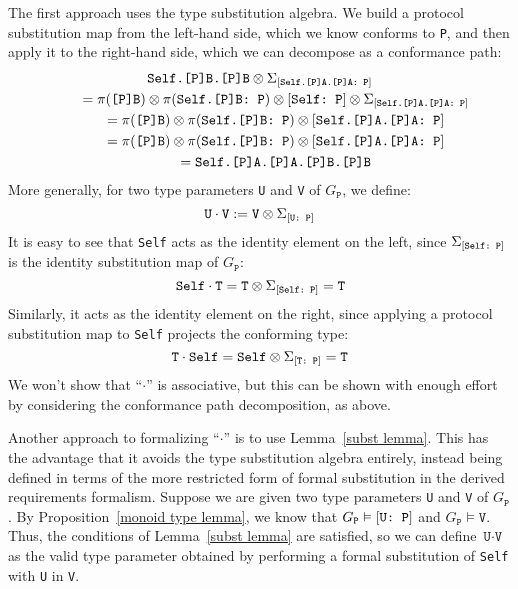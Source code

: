 \documentclass[../generics]{subfiles}
\begin{document}
The first approach uses the type substitution algebra. We build a protocol substitution map from the left-hand side, which we know conforms to \texttt{P}, and then apply it to the right-hand side, which we can decompose as a conformance path:
\begin{gather*}
\texttt{Self.[P]B.[P]B}\otimes\Sigma_{[\texttt{Self.[P]A.[P]A:~P}]}\\
\qquad {} = \pi(\texttt{[P]B}) \otimes \pi(\texttt{Self.[P]B:~P}) \otimes [\texttt{Self:~P}] \otimes \Sigma_{[\texttt{Self.[P]A.[P]A:~P}]}\\
\qquad {} = \pi(\texttt{[P]B}) \otimes \pi(\texttt{Self.[P]B:~P}) \otimes [\texttt{Self.[P]A.[P]A:~P}]\\
\qquad {} = \pi(\texttt{[P]B}) \otimes \pi(\texttt{Self.[P]B:~P}) \otimes [\texttt{Self.[P]A.[P]A:~P}]\\
\qquad {} = \texttt{Self.[P]A.[P]A.[P]B.[P]B}
\end{gather*}
More generally, for two type parameters \texttt{U} and \texttt{V} of $G_\texttt{P}$, we define:
\[\texttt{U}\cdot\texttt{V}:=\texttt{V}\otimes\Sigma_{[\texttt{U:~P}]}\]
It is easy to see that \texttt{Self} acts as the identity element on the left, since $\Sigma_{[\texttt{Self:~P}]}$ is the identity substitution map of $G_\texttt{P}$:
\[
\texttt{Self}\cdot\texttt{T} = \texttt{T}\otimes\Sigma_{[\texttt{Self:~P}]} = \texttt{T}
\]
Similarly, it acts as the identity element on the right, since applying a protocol substitution map to \texttt{Self} projects the conforming type:
\[
\texttt{T}\cdot\texttt{Self} = \texttt{Self}\otimes\Sigma_{[\texttt{T:~P}]} = \texttt{T}
\]
We won't show that ``$\cdot$'' is associative, but this can be shown with enough effort by considering the conformance path decomposition, as above.

Another approach to formalizing ``$\cdot$'' is to use Lemma~\ref{subst lemma}. This has the advantage that it avoids the type substitution algebra entirely, instead being defined in terms of the more restricted form of formal substitution in the derived requirements formalism. Suppose we are given two type parameters \texttt{U} and \texttt{V} of $G_\texttt{P}$. By Proposition~\ref{monoid type lemma}, we know that $G_\texttt{P}\vDash[\texttt{U:~P}]$ and $G_\texttt{P}\vDash\texttt{V}$. Thus, the conditions of Lemma~\ref{subst lemma} are satisfied, so we can define $\texttt{U}\cdot\texttt{V}$ as the valid type parameter obtained by performing a formal substitution of \texttt{Self} with \texttt{U} in \texttt{V}.
\end{document}
